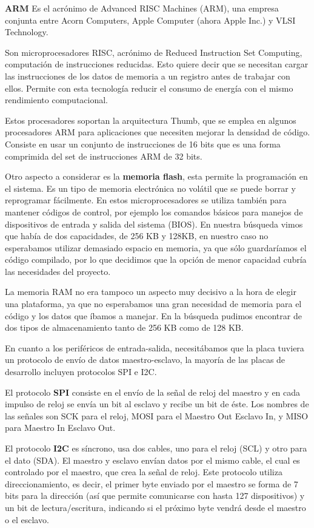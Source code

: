 \textbf{ARM} Es el acrónimo de Advanced RISC Machines (ARM), una empresa conjunta entre Acorn Computers, Apple Computer (ahora Apple Inc.) y VLSI Technology.

Son microprocesadores RISC, acrónimo de Reduced Instruction Set Computing, computación de instrucciones reducidas. Esto quiere decir que se necesitan cargar las instrucciones  de los datos de memoria a un registro antes de trabajar con ellos. Permite con esta tecnología reducir el consumo de energía con el mismo rendimiento computacional.

Estos procesadores soportan la arquitectura Thumb, que se emplea en algunos procesadores ARM para aplicaciones que necesiten mejorar la densidad de código. Consiste en usar un conjunto de instrucciones de 16 bits que es una forma comprimida del set de instrucciones ARM de 32 bits.

Otro aspecto a considerar es la \textbf{memoria flash}, esta permite la programación en el sistema. Es un tipo de memoria electrónica no volátil que se puede borrar y reprogramar fácilmente.
En estos microprocesadores se utiliza también para mantener códigos de control, por ejemplo los comandos básicos para manejos de dispositivos de entrada y salida del sistema (BIOS).
En nuestra búsqueda vimos que había de dos capacidades, de 256 KB y 128KB, en nuestro caso no esperabamos utilizar demasiado espacio en memoria, ya que sólo guardaríamos el código compilado, por lo que decidimos que la opción de menor capacidad cubría las necesidades del proyecto.

La memoria RAM no era tampoco un aspecto muy decisivo a la hora de elegir una plataforma, ya que no esperabamos una gran necesidad de memoria para el código y los datos que íbamos a manejar.
En la búsqueda pudimos encontrar de dos tipos de almacenamiento tanto de 256 KB como de 128 KB.

En cuanto a los periféricos de entrada-salida, necesitábamos que la placa tuviera un protocolo de envío de datos maestro-esclavo, la mayoría de las placas de desarrollo incluyen protocolos SPI e I2C.

El protocolo \textbf{SPI} consiste en el envío de la señal de reloj del maestro y en cada impulso de reloj se envía un bit al esclavo y recibe un bit de éste. Los nombres de las señales son SCK para el reloj, MOSI para el Maestro Out Esclavo In, y MISO para Maestro In Esclavo Out.

El protocolo \textbf{I2C} es síncrono, usa dos cables, uno para el reloj (SCL) y otro para el dato (SDA). El maestro y esclavo envían datos por el mismo cable, el cual es controlado por el maestro, que crea la señal de reloj. Este protocolo utiliza direccionamiento, es decir, el primer byte enviado por el maestro se forma de 7 bits para la dirección (así que permite comunicarse con hasta 127 dispositivos) y un bit de lectura/escritura, indicando si el próximo byte vendrá desde el maestro o el esclavo.

